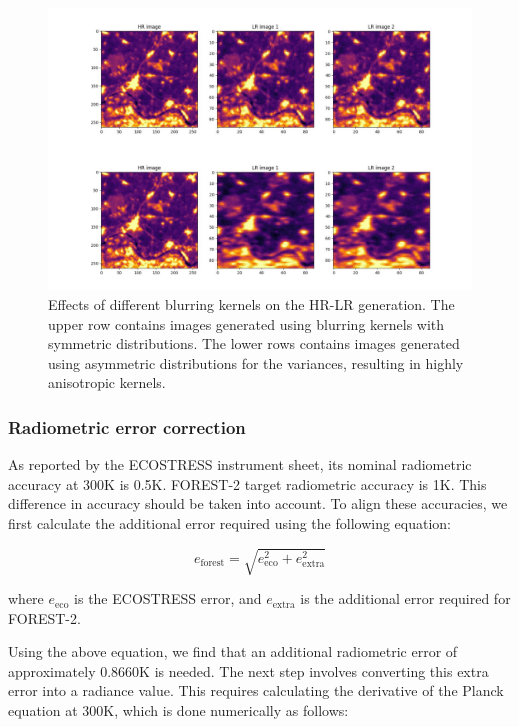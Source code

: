       \begin{figure}[ht!]
            \centering
            \includegraphics[width=\linewidth]{Includes/4-degradation-kernel-examples.pdf}
            \caption{Effects of different blurring kernels on the HR-LR generation. The upper row contains images generated using blurring kernels with symmetric distributions. The lower rows contains images generated using asymmetric distributions for the variances, resulting in highly anisotropic kernels.}
            \label{fig:4-degradation_kernels}
        \end{figure}
        
    \subsubsection{Radiometric error correction}

     As reported by the ECOSTRESS instrument sheet,\cite{ECOSTRESS2023INSTRUMENT} its nominal radiometric accuracy at 300K is 0.5K. FOREST-2 target radiometric accuracy is 1K. This difference in accuracy should be taken into account. To align these accuracies, we first calculate the additional error required using the following equation:

    \begin{equation}
        e_{\text{forest}} = \sqrt{e_{\text{eco}}^2 + e_{\text{extra}}^2} 
        \label{eq:4-radiometric-error-correction}
    \end{equation}
    
    where $e_{\text{eco}}$ is the ECOSTRESS error, and $ e_{\text{extra}}$ is the additional error required for FOREST-2.
    
    Using the above equation, we find that an additional radiometric error of approximately 0.8660K is needed. The next step involves converting this extra error into a radiance value. This requires calculating the derivative of the Planck equation at 300K, which is done numerically as follows:
    
